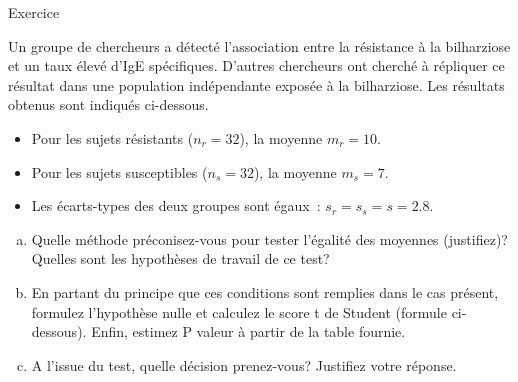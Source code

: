 \documentclass[ignorenonframetext,]{beamer}
\providecommand{\tightlist}{%
  \setlength{\itemsep}{0pt}\setlength{\parskip}{0pt}}
\begin{document}
\begin{frame}{Exercice}
\protect\hypertarget{exercice-1}{}

Un groupe de chercheurs a détecté l'association entre la résistance à la
bilharziose et un taux élevé d'IgE spécifiques. D'autres chercheurs ont
cherché à répliquer ce résultat dans une population indépendante exposée
à la bilharziose. Les résultats obtenus sont indiqués ci-dessous.

\begin{itemize}
\tightlist
\item
  Pour les sujets résistants (\(n_r=32\)), la moyenne \(m_r=10\).
\item
  Pour les sujets susceptibles (\(n_s=32\)), la moyenne \(m_s=7\).
\item
  Les écarts-types des deux groupes sont égaux~:
  \(s_r = s_s = s = 2.8\).
\end{itemize}

\begin{enumerate}
[a.]
\item
  Quelle méthode préconisez-vous pour tester l'égalité des moyennes
  (justifiez)? Quelles sont les hypothèses de travail de ce test?
\item
  En partant du principe que ces conditions sont remplies dans le cas
  présent, formulez l'hypothèse nulle et calculez le score t de Student
  (formule ci-dessous). Enfin, estimez P valeur à partir de la table
  fournie.
\item
  A l'issue du test, quelle décision prenez-vous? Justifiez votre
  réponse.
\end{enumerate}

\end{frame}
\end{document}
